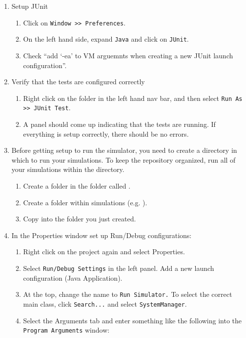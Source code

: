 \documentclass[11pt]{article}
\begin{document}
\begin{enumerate}
\item Setup JUnit
  \begin{enumerate}
  \item Click on \texttt{Window >> Preferences}.
  \item On the left hand side, expand \texttt{Java} and click on \texttt{JUnit}.
  \item Check ``add `-ea' to VM arguemnts when creating a new JUnit launch
    configuration''.
  \end{enumerate}

\item Verify that the tests are configured correctly
  \begin{enumerate}
  \item Right click on the  folder in the left hand nav bar, and
    then select \texttt{Run As >> JUnit Test}.
  \item A panel should come up indicating that the tests are running. If
    everything is setup correctly, there should be no errors.
  \end{enumerate}

\item Before getting setup to run the simulator, you need to create a directory in which to run your simulations.  To keep the repository organized, run all of your simulations within the  directory.
  \begin{enumerate}
  \item Create a folder in the  folder called .
  \item Create a folder within simulations (e.g. ).
  \item Copy  into the folder you just created.
  \end{enumerate}

\item In the Properties window set up Run/Debug configurations:
  \begin{enumerate}
  \item Right click on the project again and select Properties.
  \item Select \texttt{Run/Debug Settings} in the left panel. Add a new launch configuration (Java Application).
  \item At the top, change the name to \texttt{Run Simulator.} To select the
    correct main class, click \texttt{Search...} and select \texttt{SystemManager}.
  \item Select the Arguments tab and enter something like the following into the \texttt{Program Arguments} window:


\end{enumerate}
\end{enumerate}
\end{document}
